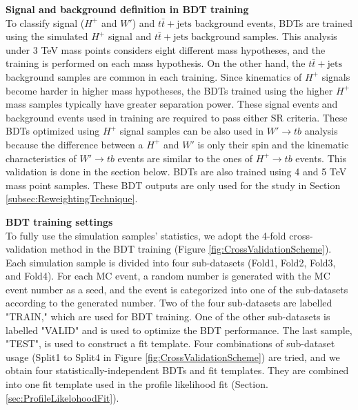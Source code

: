 \begin{description}
    \item{\textbf{Signal and background definition in BDT training}}\mbox{}\\
    To classify signal ($H^{+}$ and $W'$) and $t\bar{t}+\text{jets}$ background events, BDTs are trained using the simulated $H^{+}$ signal and $t\bar{t}+\text{jets}$ background samples. This analysis under 3 TeV mass points considers eight different mass hypotheses, and the training is performed on each mass hypothesis. On the other hand, the $t\bar{t}+\text{jets}$ background samples are common in each training. Since kinematics of $H^+$ signals become harder in higher mass hypotheses, the BDTs trained using the higher $H^{+}$ mass samples typically have greater separation power. These signal events and background events used in training are required to pass either SR criteria. These BDTs optimized using $H^{+}$ signal samples can be also used in $W' \rightarrow tb$ analysis because the difference between a $H^{+}$ and $W'$ is only their spin and the kinematic characteristics of $W' \rightarrow tb$ events are similar to the ones of $H^{+} \rightarrow tb$ events. This validation is done in the section below. BDTs are also trained using 4 and 5 TeV mass point samples. These BDT outputs are only used for the study in Section \ref{subsec:ReweightingTechnique}.

    \item{\textbf{BDT training settings}}\mbox{}\\
    To fully use the simulation samples' statistics, we adopt the 4-fold cross-validation method in the BDT training (Figure \ref{fig:CrossValidationScheme}). Each simulation sample is divided into four sub-datasets (Fold1, Fold2, Fold3, and Fold4). For each MC event, a random number is generated with the MC event number as a seed, and the event is categorized into one of the sub-datasets according to the generated number. Two of the four sub-datasets are labelled "TRAIN," which are used for BDT training. One of the other sub-datasets is labelled "VALID" and is used to optimize the BDT performance. The last sample, "TEST", is used to construct a fit template. Four combinations of sub-dataset usage (Split1 to Split4 in Figure \ref{fig:CrossValidationScheme}) are tried, and we obtain four statistically-independent BDTs and fit templates. They are combined into one fit template used in the profile likelihood fit (Section.\ref{sec:ProfileLikelohoodFit}).
    

\end{description}
